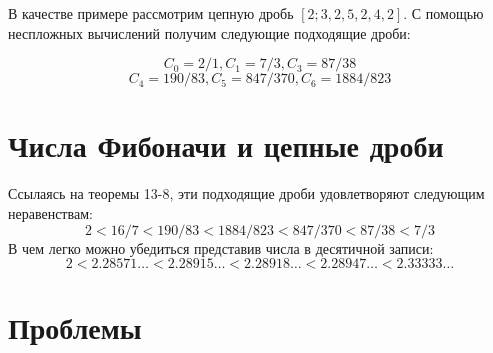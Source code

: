 \documentclass[11pt]{article}
\begin{document}
		В качестве примере рассмотрим цепную дробь $[2;3,2,5,2,4,2]$. С помощью неспложных вычислений получим следующие подходящие дроби: 

				\[C_0=2/1,C_1=7/3,C_3=87/38\]
				\[C_4=190/83,C_5=847/370,C_6=1884/823\]
		
		
		\section{Числа Фибоначи и цепные дроби}
		Ссылаясь на теоремы 13-8, эти подходящие дроби удовлетворяют следующим неравенствам:
		$$2<16/7<190/83<1884/823<847/370<87/38<7/3$$
		В чем легко можно убедиться представив числа в десятичной записи:
		$$2<2.28571\dots<2.28915\dots<2.28918\dots<2.28947\dots<2.33333\dots$$
		
	\section{Проблемы}
\noindent
\end{document}
